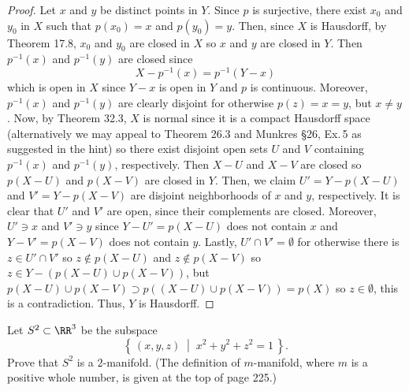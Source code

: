 \begin{proof}
Let $x$ and $y$ be distinct points in $Y$. Since $p$ is surjective, there
exist $x_0$ and $y_0$ in $X$ such that $p(x_0)=x$ and $p(y_0)=y$. Then,
since $X$ is Hausdorff, by Theorem 17.8, $x_0$ and $y_0$ are closed in $X$
so $x$ and $y$ are closed in $Y$. Then $p^{-1}(x)$ and $p^{-1}(y)$ are
closed since
\[
X-p^{-1}(x)=p^{-1}(Y-x)
\]
which is open in $X$ since $Y-x$ is open in $Y$ and $p$ is
continuous. Moreover, $p^{-1}(x)$ and $p^{-1}(y)$ are clearly disjoint for
otherwise $p(z)=x=y$, but $x\neq y$. Now, by Theorem 32.3, $X$ is normal
since it is a compact Hausdorff space (alternatively we may appeal to
Theorem 26.3 and Munkres \S 26, Ex.\,5 as suggested in the hint) so there
exist disjoint open sets $U$ and $V$ containing $p^{-1}(x)$ and
$p^{-1}(y)$, respectively. Then $X-U$ and $X-V$ are closed so $p(X-U)$ and
$p(X-V)$ are closed in $Y$. Then, we claim $U'=Y-p(X-U)$ and $V'=Y-p(X-V)$
are disjoint neighborhoods of $x$ and $y$, respectively. It is clear that
$U'$ and $V'$ are open, since their complements are closed. Moreover,
$U'\ni x$ and $V'\ni y$ since $Y-U'=p(X-U)$ does not contain $x$ and
$Y-V'=p(X-V)$ does not contain $y$. Lastly, $U'\cap V'=\emptyset$ for
otherwise there is $z\in U'\cap V'$ so $z\notin p(X-U)$ and $z\notin
p(X-V)$ so $z\in Y-(p(X-U)\cup p(X-V))$, but $p(X-U)\cup p(X-V)\supset
p((X-U)\cup p(X-V))=p(X)$ so $z\in\emptyset$, this is a
contradiction. Thus, $Y$ is Hausdorff.
\end{proof}
\newpage
\begin{problem}[(C)]
Let $S^2\subset\RR^3$ be the subspace
\[
\left\{\,(x,y,z)\;\middle|\; x^2+y^2+z^2=1\,\right\}.
\]
Prove that $S^2$ is a $2$-manifold. (The definition of
$m$-manifold, where $m$ is a positive whole number, is given at
the top of page 225.)
\end{problem}

